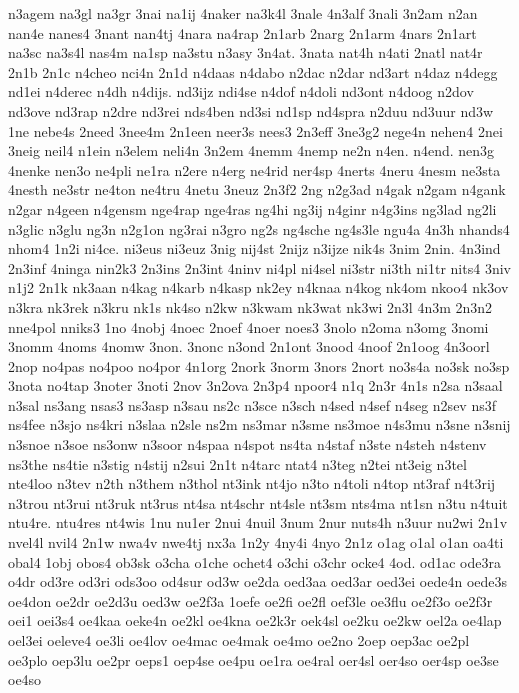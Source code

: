 {n3agem
na3gl
na3gr
3nai
na1ij
4naker
na3k4l
3nale
4n3alf
3nali
3n2am
n2an
nan4e
nanes4
3nant
nan4tj
4nara
na4rap
2n1arb
2narg
2n1arm
4nars
2n1art
na3sc
na3s4l
nas4m
na1sp
na3stu
n3asy
3n4at.
3nata
nat4h
n4ati
2natl
nat4r
2n1b
2n1c
n4cheo
nci4n
2n1d
n4daas
n4dabo
n2dac
n2dar
nd3art
n4daz
n4degg
nd1ei
n4derec
n4dh
n4dijs.
nd3ijz
ndi4se
n4dof
n4doli
nd3ont
n4doog
n2dov
nd3ove
nd3rap
n2dre
nd3rei
nds4ben
nd3si
nd1sp
nd4spra
n2duu
nd3uur
nd3w
1ne
nebe4s
2need
3nee4m
2n1een
neer3s
nees3
2n3eff
3ne3g2
nege4n
nehen4
2nei
3neig
neil4
n1ein
n3elem
neli4n
3n2em
4nemm
4nemp
ne2n
n4en.
n4end.
nen3g
4nenke
nen3o
ne4pli
ne1ra
n2ere
n4erg
ne4rid
ner4sp
4nerts
4neru
4nesm
ne3sta
4nesth
ne3str
ne4ton
ne4tru
4netu
3neuz
2n3f2
2ng
n2g3ad
n4gak
n2gam
n4gank
n2gar
n4geen
n4gensm
nge4rap
nge4ras
ng4hi
ng3ij
n4ginr
n4g3ins
ng3lad
ng2li
n3glic
n3glu
ng3n
n2g1on
ng3rai
n3gro
ng2s
ng4sche
ng4s3le
ngu4a
4n3h
nhands4
nhom4
1n2i
ni4ce.
ni3eus
ni3euz
3nig
nij4st
2nijz
n3ijze
nik4s
3nim
2nin.
4n3ind
2n3inf
4ninga
nin2k3
2n3ins
2n3int
4ninv
ni4pl
ni4sel
ni3str
ni3th
ni1tr
nits4
3niv
n1j2
2n1k
nk3aan
n4kag
n4karb
n4kasp
nk2ey
n4knaa
n4kog
nk4om
nkoo4
nk3ov
n3kra
nk3rek
n3kru
nk1s
nk4so
n2kw
n3kwam
nk3wat
nk3wi
2n3l
4n3m
2n3n2
nne4pol
nniks3
1no
4nobj
4noec
2noef
4noer
noes3
3nolo
n2oma
n3omg
3nomi
3nomm
4noms
4nomw
3non.
3nonc
n3ond
2n1ont
3nood
4noof
2n1oog
4n3oorl
2nop
no4pas
no4poo
no4por
4n1org
2nork
3norm
3nors
2nort
no3s4a
no3sk
no3sp
3nota
no4tap
3noter
3noti
2nov
3n2ova
2n3p4
npoor4
n1q
2n3r
4n1s
n2sa
n3saal
n3sal
ns3ang
nsas3
ns3asp
n3sau
ns2c
n3sce
n3sch
n4sed
n4sef
n4seg
n2sev
ns3f
ns4fee
n3sjo
ns4kri
n3slaa
n2sle
ns2m
ns3mar
n3sme
ns3moe
n4s3mu
n3sne
n3snij
n3snoe
n3soe
ns3onw
n3soor
n4spaa
n4spot
ns4ta
n4staf
n3ste
n4steh
n4stenv
ns3the
ns4tie
n3stig
n4stij
n2sui
2n1t
n4tarc
ntat4
n3teg
n2tei
nt3eig
n3tel
nte4loo
n3tev
n2th
n3them
n3thol
nt3ink
nt4jo
n3to
n4toli
n4top
nt3raf
n4t3rij
n3trou
nt3rui
nt3ruk
nt3rus
nt4sa
nt4schr
nt4sle
nt3sm
nts4ma
nt1sn
n3tu
n4tuit
ntu4re.
ntu4res
nt4wis
1nu
nu1er
2nui
4nuil
3num
2nur
nuts4h
n3uur
nu2wi
2n1v
nvel4l
nvil4
2n1w
nwa4v
nwe4tj
nx3a
1n2y
4ny4i
4nyo
2n1z
o1ag
o1al
o1an
oa4ti
obal4
1obj
obos4
ob3sk
o3cha
o1che
ochet4
o3chi
o3chr
ocke4
4od.
od1ac
ode3ra
o4dr
od3re
od3ri
ods3oo
od4sur
od3w
oe2da
oed3aa
oed3ar
oed3ei
oede4n
oede3s
oe4don
oe2dr
oe2d3u
oed3w
oe2f3a
1oefe
oe2fi
oe2fl
oef3le
oe3flu
oe2f3o
oe2f3r
oei1
oei3s4
oe4kaa
oeke4n
oe2kl
oe4kna
oe2k3r
oek4sl
oe2ku
oe2kw
oel2a
oe4lap
oel3ei
oeleve4
oe3li
oe4lov
oe4mac
oe4mak
oe4mo
oe2no
2oep
oep3ac
oe2pl
oe3plo
oep3lu
oe2pr
oeps1
oep4se
oe4pu
oe1ra
oe4ral
oer4sl
oer4so
oer4sp
oe3se
oe4so
}
